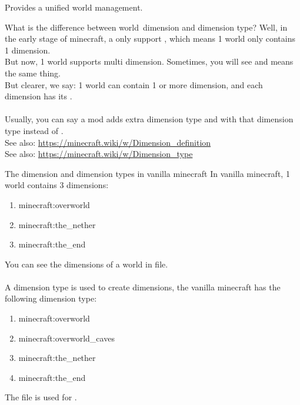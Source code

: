 
Provides a unified world management.



\begin{note}{What is the difference between world\tcomma\ dimension and dimension type?}
    Well, in the early stage of minecraft, a  only support , which means 1 world only contains 1 dimension.\\
    But now, 1 world supports multi dimension.
    Sometimes, you will see  and  means the same thing.\\
    But clearer, we say: 1 world can contain 1 or more dimension, and each dimension has its .\\
    \\
    Usually, you can say a mod adds extra dimension type and  with that dimension type instead of .\\
    See also: \url{https://minecraft.wiki/w/Dimension_definition}\\
    See also: \url{https://minecraft.wiki/w/Dimension_type}
\end{note}

\begin{note}{The dimension and dimension types in vanilla minecraft}
    In vanilla minecraft, 1 world contains 3 dimensions:
    \begin{enumerate}
        \item minecraft:overworld
        \item minecraft:the\_nether
        \item minecraft:the\_end
    \end{enumerate}
    You can see the dimensions of a world in  file.\\
    \\
    A dimension type is used to create dimensions, the vanilla minecraft has the following dimension type:
    \begin{enumerate}
        \item minecraft:overworld
        \item minecraft:overworld\_caves
        \item minecraft:the\_nether
        \item minecraft:the\_end
    \end{enumerate}

    The file  is used for .
\end{note}

